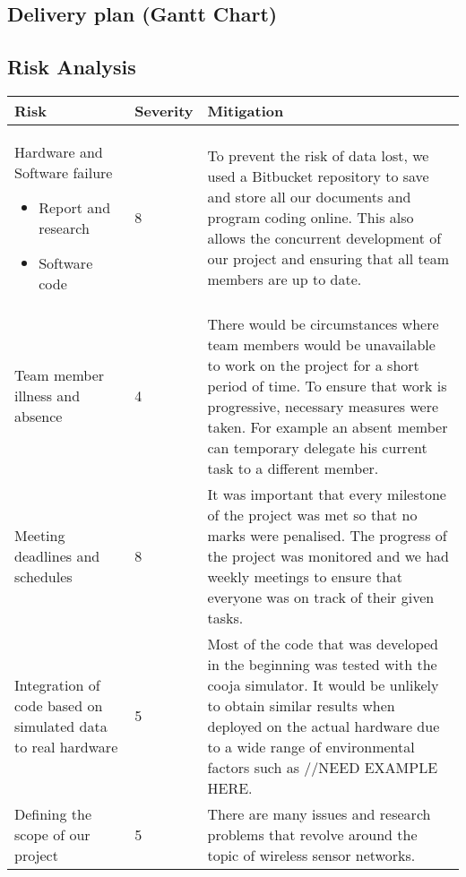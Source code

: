 \subsection{Delivery plan (Gantt Chart)}

\subsection{Risk Analysis}

\begin{center}
	\begin{longtable}{| p{5cm} | l | p{8cm} |}
	\hline
	Risk & Severity & Mitigation\\
	\hline	
	
	Hardware and Software failure
	\begin{itemize}
		\item Report and research
		\item Software code
	\end{itemize}
	 & 8 & To prevent the risk of data lost, we used a Bitbucket repository to save and store all our documents and program coding online. This also allows the concurrent development of our project and ensuring that all team members are up to date.
	\\ \hline
	
	Team member illness and absence
	& 4 & There would be circumstances where team members would be unavailable to work on the project for a short period of time. To ensure that work is progressive, necessary measures were taken. For example an absent member can temporary delegate his current task to a different member.
	\\ \hline
		
	Meeting deadlines and schedules
	& 8 & It was important that every milestone of the project was met so that no marks were penalised. The progress of the project was monitored and we had weekly meetings to ensure that everyone was on track of their given tasks.
	\\ \hline
	
	Integration of code based on simulated data to real hardware
	& 5 & Most of the code that was developed in the beginning was tested with the cooja simulator. It would be unlikely to obtain similar results when deployed on the actual hardware due to a wide range of environmental factors such as //NEED EXAMPLE HERE.
		\\ \hline
		
	Defining the scope of our project
	& 5 & There are many issues and research problems that revolve around the topic of wireless sensor networks.


\end{longtable}
\end{center}
